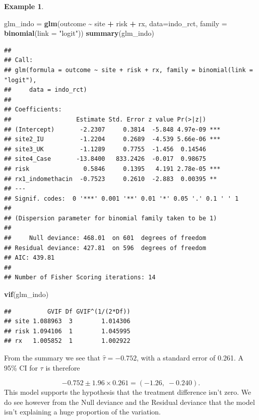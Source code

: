 \documentclass[
  openany]{book}
\newenvironment{Shaded}{\begin{snugshade}}{\end{snugshade}}
\newcommand{\AttributeTok}[1]{\textcolor[rgb]{0.13,0.29,0.53}{#1}}
\newcommand{\FunctionTok}[1]{\textcolor[rgb]{0.13,0.29,0.53}{\textbf{#1}}}
\newcommand{\NormalTok}[1]{#1}
\newcommand{\OtherTok}[1]{\textcolor[rgb]{0.56,0.35,0.01}{#1}}
\newcommand{\SpecialCharTok}[1]{\textcolor[rgb]{0.81,0.36,0.00}{\textbf{#1}}}
\newcommand{\StringTok}[1]{\textcolor[rgb]{0.31,0.60,0.02}{#1}}
\theoremstyle{definition}
\theoremstyle{definition}
\newtheorem{example}{Example}[chapter]
\theoremstyle{definition}
\theoremstyle{definition}
\theoremstyle{remark}
\begin{document}
\begin{example}
\begin{Shaded}
\begin{Highlighting}[]
\NormalTok{glm\_indo }\OtherTok{=} \FunctionTok{glm}\NormalTok{(outcome }\SpecialCharTok{\textasciitilde{}}\NormalTok{ site }\SpecialCharTok{+}\NormalTok{ risk }\SpecialCharTok{+}\NormalTok{ rx, }\AttributeTok{data=}\NormalTok{indo\_rct, }\AttributeTok{family =} \FunctionTok{binomial}\NormalTok{(}\AttributeTok{link =} \StringTok{"logit"}\NormalTok{))}
\FunctionTok{summary}\NormalTok{(glm\_indo)}
\end{Highlighting}
\end{Shaded}

\begin{verbatim}
## 
## Call:
## glm(formula = outcome ~ site + risk + rx, family = binomial(link = "logit"), 
##     data = indo_rct)
## 
## Coefficients:
##                  Estimate Std. Error z value Pr(>|z|)    
## (Intercept)       -2.2307     0.3814  -5.848 4.97e-09 ***
## site2_IU          -1.2204     0.2689  -4.539 5.66e-06 ***
## site3_UK          -1.1289     0.7755  -1.456  0.14546    
## site4_Case       -13.8400   833.2426  -0.017  0.98675    
## risk               0.5846     0.1395   4.191 2.78e-05 ***
## rx1_indomethacin  -0.7523     0.2610  -2.883  0.00395 ** 
## ---
## Signif. codes:  0 '***' 0.001 '**' 0.01 '*' 0.05 '.' 0.1 ' ' 1
## 
## (Dispersion parameter for binomial family taken to be 1)
## 
##     Null deviance: 468.01  on 601  degrees of freedom
## Residual deviance: 427.81  on 596  degrees of freedom
## AIC: 439.81
## 
## Number of Fisher Scoring iterations: 14
\end{verbatim}

\begin{Shaded}
\begin{Highlighting}[]
\FunctionTok{vif}\NormalTok{(glm\_indo)}
\end{Highlighting}
\end{Shaded}

\begin{verbatim}
##          GVIF Df GVIF^(1/(2*Df))
## site 1.088963  3        1.014306
## risk 1.094106  1        1.045995
## rx   1.005852  1        1.002922
\end{verbatim}

From the summary we see that \(\hat\tau = -0.752\), with a standard error of 0.261. A 95\% CI for \(\tau\) is therefore

\[-0.752 \pm 1.96\times 0.261 = \left(-1.26,\;-0.240\right).\]
This model supports the hypothesis that the treatment difference isn't zero. We do see however from the Null deviance and the Residual deviance that the model isn't explaining a huge proportion of the variation.
\end{example}
\end{document}
